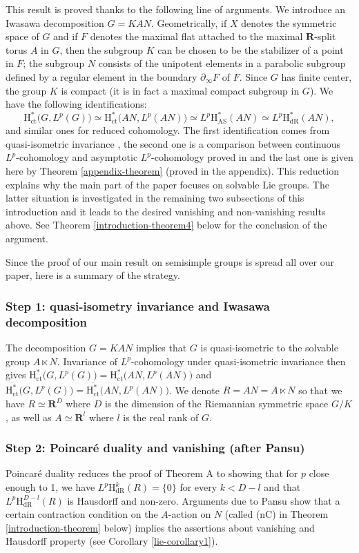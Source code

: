 \documentclass[JEP,XML,SOM,Unicode,published]{cedram}
\newcommand{\AS}{\mathrm{AS}}
\newcommand{\ct}{\mathrm{ct}}
\newcommand{\dR}{\mathrm{dR}}
\newcommand{\rH}{\mathrm{H}}
\newcommand{\RR}{\mathbf{R}}
\theoremstyle{plain}
\theoremstyle{remark}
\theoremstyle{definition}
\begin{document}
This result is proved thanks to the following line of arguments.
We introduce an Iwasawa decomposition $G = KAN$.
Geometrically, if $X$ denotes the symmetric space of $G$ and if $F$ denotes the maximal flat attached to the maximal $\RR$-split torus $A$ in $G$, then the subgroup $K$ can be chosen to be the stabilizer of a point in $F$; the subgroup $N$ consists of the unipotent elements in a parabolic subgroup defined by a regular element in the boundary $\partial_\infty F$ of $F$.
Since $G$ has finite center, the group $K$ is compact (it is in fact a maximal compact subgroup in $G$).
We have the following identifications:
\[
\rH^*_\ct \bigl(G, L^p(G) \bigr) \simeq \rH^*_\ct \bigl(AN, L^p(AN) \bigr) \simeq L^p \rH^*_\AS(AN) \simeq L^p \rH^*_\dR(AN),
\]
and similar ones for reduced cohomology.
The first identification comes from quasi-isometric invariance \cite[Th.\,1.1]{BR}, the second one is a comparison between continuous $L^p$\nobreakdash-cohomology and asymptotic $L^p$\nobreakdash-cohomology proved in \cite[Th.\,3.6]{BR} and the last one is given here by Theorem \ref{appendix-theorem} (proved in the appendix).
This reduction explains why the main part of the paper focuses on solvable Lie groups.
The latter situation is investigated in the remaining two subsections of this introduction and it leads to the desired vanishing and non-vanishing results above.
See Theorem \ref{introduction-theorem4} below for the conclusion of the argument.

Since the proof of our main result on semisimple groups is spread all over our paper, here is a summary of the strategy.

\subsubsection*{Step 1: quasi-isometry invariance and Iwasawa decomposition}
The decomposition $G=KAN$ implies that $G$ is quasi-isometric to the solvable group $A \ltimes N$.
Invariance of $L^p$\nobreakdash-cohomology under quasi-isometric invariance then gives
$\rH^*_\ct\bigl(G, L^p(G) \bigr) = \rH^*_\ct\bigl(AN, L^p(AN) \bigr)$ and
$\overline{\rH^*_\ct} \bigl(G, L^p(G) \bigr) = \overline{\rH^*_\ct}\bigl(AN, L^p(AN) \bigr)$.
We denote $R = AN = A \ltimes N$ so that we have $R \simeq \RR^D$ where $D$ is the dimension of the Riemannian symmetric space $G/K$, as well as $A \simeq \RR^l$ where $l$ is the real rank of $G$.

\subsubsection*{Step 2: Poincaré duality and vanishing (after Pansu)}
Poincaré duality reduces the proof of Theorem A to showing that for $p$ close enough to 1, we have $L^p\rH^k_\dR(R) = \{ 0 \}$ for every $k < D-l$ and that $L^p\rH^{D-l}_\dR(R)$ is Hausdorff and non-zero.
Arguments due to Pansu show that a certain contraction condition on the $A$-action on $N$ (called (nC) in Theorem \ref{introduction-theorem} below) implies the assertions about vanishing and Hausdorff property (see Corollary \ref{lie-corollary1}).
\end{document}
